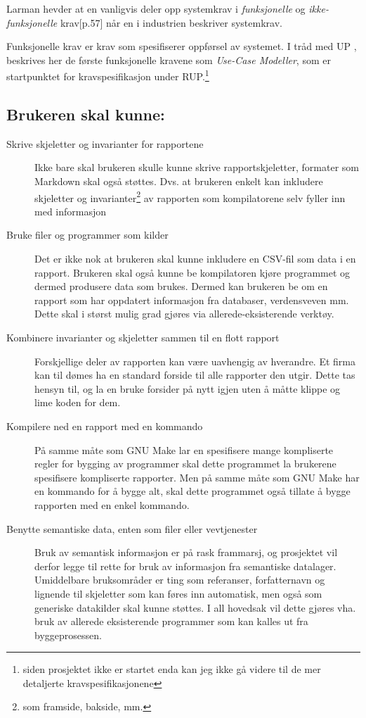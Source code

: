 \documentclass[11pt]{article}
\begin{document}
Larman hevder at en vanligvis deler opp systemkrav i \emph{funksjonelle} og \emph{ikke-funksjonelle} krav\cite{Larman2005}[p.57] når en i industrien beskriver systemkrav.

Funksjonelle krav er krav som spesifiserer oppførsel av systemet.
I tråd med UP \cite{Larman2005} , beskrives her de første funksjonelle kravene som \emph{Use-Case Modeller}, som er startpunktet for kravspesifikasjon under RUP.\footnote{siden prosjektet ikke er startet enda kan jeg ikke gå videre til de mer detaljerte kravspesifikasjonene}

\subsection{Brukeren skal kunne:}
\label{subsec:eval-brukerhistorier}
\begin{description}
\item [Skrive skjeletter og invarianter for rapportene]
  Ikke bare skal brukeren skulle kunne skrive rapportskjeletter,
  formater som Markdown skal også støttes.
  Dvs. at brukeren enkelt kan inkludere skjeletter og invarianter\footnote{som framside, bakside, mm.}
  av rapporten som kompilatorene selv fyller inn med informasjon
\item [Bruke filer og programmer som kilder]
  Det er ikke nok at brukeren skal kunne inkludere en CSV-fil som data i en rapport.
  Brukeren skal også kunne be kompilatoren kjøre programmet og dermed produsere data som brukes.
  Dermed kan brukeren be om en rapport som har oppdatert informasjon fra databaser, verdensveven mm.
  Dette skal i størst mulig grad gjøres via allerede-eksisterende verktøy.
\item [Kombinere invarianter og skjeletter sammen til en flott rapport]
  Forskjellige deler av rapporten kan være uavhengig av hverandre.
  Et firma kan til dømes ha en standard forside til alle rapporter den utgir.
  Dette tas hensyn til, og la en bruke forsider på nytt igjen uten å måtte klippe og lime koden for dem.
\item [Kompilere ned en rapport med en kommando]
  På samme måte som GNU Make\cite{GNU-MAKE} lar en spesifisere mange kompliserte regler
  for bygging av programmer skal dette programmet la brukerene spesifisere kompliserte rapporter.
  Men på samme måte som GNU Make har en kommando for å bygge alt,
  skal dette programmet også tillate å bygge rapporten med en enkel kommando.
\item [Benytte semantiske data, enten som filer eller vevtjenester]
  Bruk av semantisk informasjon er på rask frammarsj,
  og prosjektet vil derfor legge til rette for bruk av informasjon fra semantiske datalager.
  Umiddelbare bruksområder er ting som referanser, forfatternavn og lignende til skjeletter som kan føres inn automatisk, men også som generiske datakilder skal kunne støttes.
  I all hovedsak vil dette gjøres vha. bruk av allerede eksisterende programmer
  som kan kalles ut fra byggeprosessen.
\end{description}
\end{document}
